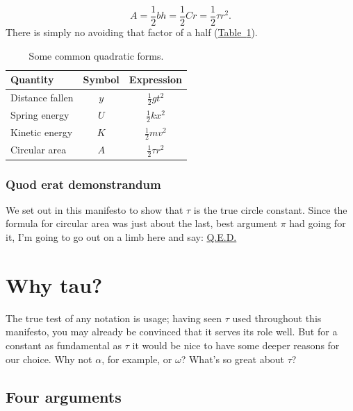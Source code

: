 \documentclass{article}
\begin{document}
\[
  A = \textstyle{\frac{1}{2}} bh = \textstyle{\frac{1}{2}}Cr = \textstyle{\frac{1}{2}}\tau r^2.
\]
There is simply no avoiding that factor of a half  (\hyperref[table:quadratic_forms]{Table~}\ref{table:quadratic_forms}).

\begin{table}
\begin{center}
\begin{tabular}{lcc}
Quantity & Symbol & Expression \\ \hline
Distance fallen & $y$ & $\textstyle{\frac{1}{2}}gt^2$ \\
Spring energy & $U$ & $\textstyle{\frac{1}{2}}kx^2$ \\
Kinetic energy & $K$ & $\textstyle{\frac{1}{2}}mv^2$ \\
Circular area & $A$ & $\textstyle{\frac{1}{2}}\tau r^2$
\end{tabular}
\end{center}
\caption{Some common quadratic forms.\label{table:quadratic_forms}}
\end{table}

    \subsubsection{Quod erat demonstrandum} %
    \label{sec:quod_erat_demonstrandum}
    

We set out in this manifesto to show that $\tau$ is the true circle constant. Since the formula for circular area was just about the last, best argument $\pi$ had going for it, I'm going to go out on a limb here and say: \href{http://en.wikipedia.org/wiki/Q.E.D.}{Q.E.D.}


\section{Why tau?} %
\label{sec:why_tau}

The true test of any notation is usage; having seen $\tau$ used throughout this manifesto, you may already be convinced that it serves its role well. But for a constant as fundamental as $\tau$ it would be nice to have some deeper reasons for our choice. Why not $\alpha$, for example, or $\omega$? What's so great about $\tau$?

  \subsection{Four arguments} %
  \label{sec:four_arguments}
\end{document}
